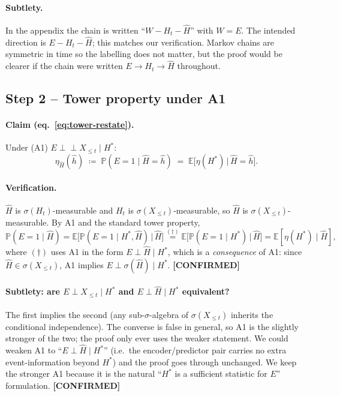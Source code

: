 \documentclass[11pt]{article}
\newcommand{\E}{\mathbb{E}}
\newcommand{\PP}{\mathbb{P}}
\newcommand{\CONF}{{\color{black!60!green}\textbf{[CONFIRMED]}}}
\begin{document}
\paragraph{Subtlety.}
In the appendix the chain is written ``$W-H_t-\hat H$'' with $W=E$. The
intended direction is $E - H_t - \hat H$; this matches our verification.
Markov chains are symmetric in time so the labelling does not matter, but
the proof would be clearer if the chain were written
$E\to H_t\to \hat H$ throughout.

\subsection{Step 2 -- Tower property under A1}

\paragraph{Claim (eq.~\ref{eq:tower-restate}).}
Under (A1) $E\perp\!\!\!\perp X_{\le t}\mid H^*$:
\begin{equation}\label{eq:tower-restate}
\eta_{\hat H}(\hat h)\;\coloneqq\;\PP(E=1\mid \hat H=\hat h)
\;=\;\E\bigl[\eta(H^*)\,\big|\,\hat H=\hat h\bigr].
\end{equation}

\paragraph{Verification.}
$\hat H$ is $\sigma(H_t)$-measurable and $H_t$ is $\sigma(X_{\le t})$-measurable,
so $\hat H$ is $\sigma(X_{\le t})$-measurable. By A1 and the standard
tower property,
\[
\PP(E=1\mid\hat H)
=\E\!\bigl[\PP(E=1\mid H^*,\hat H)\,\big|\,\hat H\bigr]
\stackrel{(\dagger)}{=}\E\!\bigl[\PP(E=1\mid H^*)\,\big|\,\hat H\bigr]
=\E[\eta(H^*)\mid\hat H],
\]
where $(\dagger)$ uses A1 in the form $E\perp\hat H\mid H^*$, which is a
\emph{consequence} of A1: since $\hat H\in\sigma(X_{\le t})$, A1 implies
$E\perp\sigma(\hat H)\mid H^*$. \CONF

\paragraph{Subtlety: are $E\perp X_{\le t}\mid H^*$ and $E\perp\hat H\mid H^*$
equivalent?}
The first implies the second (any sub-$\sigma$-algebra of $\sigma(X_{\le t})$
inherits the conditional independence). The converse is false in general,
so A1 is the slightly stronger of the two; the proof only ever uses the
weaker statement. We could weaken A1 to ``$E\perp\hat H\mid H^*$'' (i.e.\
the encoder/predictor pair carries no extra event-information beyond
$H^*$) and the proof goes through unchanged. We keep the stronger A1
because it is the natural ``$H^*$ is a sufficient statistic for $E$''
formulation. \CONF
\end{document}

